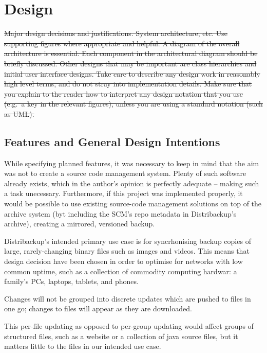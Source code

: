 \documentclass[12pt,a4paper,]{adreport}
\begin{document}
\chapter{Design}\label{design}

\sout{Major design decisions and justifications. System architecture,
etc. Use supporting figures where appropriate and helpful. A diagram of
the overall architecture is essential. Each component in the
architectural diagram should be briefly discussed. Other designs that
may be important are class hierarchies and initial user interface
designs. Take care to describe any design work in reasonably high level
terms, and do not stray into implementation details. Make sure that you
explain to the reader how to interpret any design notation that you use
(e.g.~a key in the relevant figures), unless you are using a standard
notation (such as UML).}

\section{Features and General Design
Intentions}\label{features-and-general-design-intentions}

While specifying planned features, it was necessary to keep in mind that
the aim was not to create a source code management system. Plenty of
such software already exists, which in the author's opinion is perfectly
adequate -- making such a task unecessary. Furthermore, if this project
was implemented properly, it would be possible to use existing
source-code management solutions on top of the archive system (byt
including the SCM's repo metadata in Distribackup's archive), creating a
mirrored, versioned backup.

Distribackup's intended primary use case is for syncrhonising backup
copies of large, rarely-changing binary files such as images and videos.
This means that design decision have been chosen in order to optimise
for networks with low common uptime, such as a collection of commodity
computing hardwar: a family's PCs, laptops, tablets, and phones.

Changes will not be grouped into discrete updates which are pushed to
files in one go; changes to files will appear as they are downloaded.

This per-file updating as opposed to per-group updating would affect
groups of structured files, such as a website or a collection of java
source files, but it matters little to the files in our intended use
case.
\end{document}
